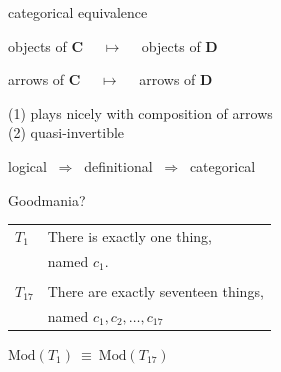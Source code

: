 \documentclass[17pt]{beamer}
\begin{document}
\def\3{\mathbf}


\begin{frame}{\small categorical equivalence}

objects of $\3C$  $\quad \longmapsto \quad$ objects of $\3D$ 

\bigskip arrows of $\3C$ $\quad \longmapsto \quad$ arrows of $\3D$

\bigskip (1) plays nicely with composition of arrows \\
(2) quasi-invertible 




\end{frame}

\begin{frame}

  \begin{center} logical $\:\Longrightarrow\:$ definitional
      $\:\Longrightarrow\:$ categorical 
\end{center}


\end{frame}



\begin{frame}{\small Goodmania?}

\begin{tabular}{l  l}

  $T_1$ & There is exactly one thing, \\ & named $c_1$. \\ \\ 
  $T_{17}$ & There are exactly seventeen things, \\ 
& named $c_1,c_2,\dots
  ,c_{17}$ \end{tabular}

\vspace{2em} \begin{center} \textcolor{red}{\danger} \quad $\mathrm{Mod}(T_1)\:\equiv\:
\mathrm{Mod}(T_{17})$ \quad \textcolor{red}{\danger} \end{center}




\end{frame}

\end{document}
